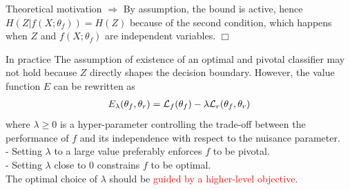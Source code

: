 \documentclass[final,unknownkeysallowed]{beamer}
\newcommand{\qedwhite}{\hfill \ensuremath{\Box}}
\begin{document}
\begin{frame}{}
\begin{textblock}{0.32}
\begin{block}{Theoretical motivation \phantom{p}}
$\Rightarrow$ By assumption, the bound is active, hence $H(Z|f(X;\theta_f)) = H(Z)$
because of the second condition, which happens when $Z$ and $f(X;\theta_f)$
are independent variables.
\qedwhite

\end{block}

\vspace{0.2cm}
\begin{block}{In practice\phantom{p}}
The assumption of existence of an optimal and pivotal classifier may
not hold because $Z$ directly shapes the decision boundary.
However, the value function $E$ can be rewritten  as
\begin{align}
E_\lambda(\theta_f, \theta_r) = {\cal L}_f(\theta_f) - \lambda {\cal L}_r(\theta_f, \theta_r)
\end{align}
where $\lambda \geq 0$ is a hyper-parameter controlling the trade-off between
the performance of $f$ and its independence with respect to the nuisance
parameter. \\
- Setting $\lambda$ to a large value preferably enforces $f$ to be pivotal.\\
- Setting $\lambda$ close to $0$ constrains $f$ to be optimal.\\
The optimal choice of $\lambda$ should be \textcolor{red}{guided by a higher-level objective}.
\end{block}


\end{textblock}
\end{frame}
\end{document}
